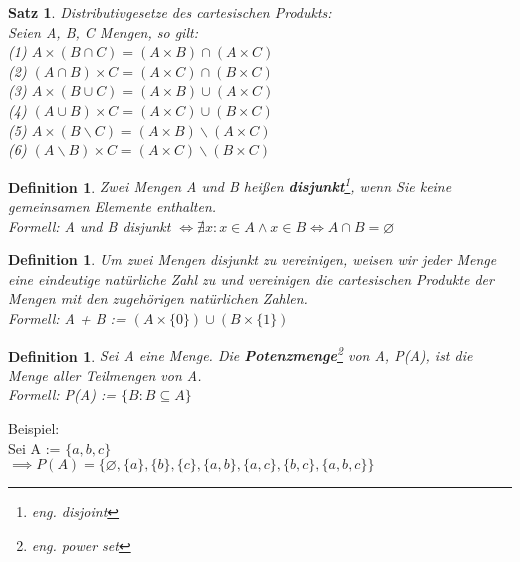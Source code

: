 \documentclass[12pt,german,a4]{article}
\begin{document}
\newtheorem{satz5}[satz]{Satz}
\begin{satz5}
Distributivgesetze des cartesischen Produkts:\\
Seien A, B, C Mengen, so gilt:\\
(1) $A \times (B \cap C) = (A \times B) \cap (A \times C)$\\
(2) $(A \cap B) \times C = (A \times C) \cap (B \times C)$\\
(3) $A \times (B \cup C) = (A \times B) \cup (A \times C)$\\
(4) $(A \cup B) \times C = (A \times C) \cup (B \times C)$\\
(5) $A \times (B \backslash C) = (A \times B) \backslash (A \times C)$\\
(6) $(A \backslash B) \times C = (A \times C) \backslash (B \times C)$
\end{satz5}

\newtheorem{defDisjoint}[defSet]{Definition}
\begin{defDisjoint}
Zwei Mengen A und B heißen {\bf disjunkt}\footnote{eng. disjoint}, wenn Sie keine gemeinsamen Elemente enthalten.\\
Formell: A und B disjunkt $\Leftrightarrow \nexists x: x \in A \wedge x \in B \Leftrightarrow A \cap B = \varnothing$
\end{defDisjoint}

\pagebreak

\newtheorem{defDisjointUnion}[defSet]{Definition}
\begin{defDisjointUnion}
Um zwei Mengen disjunkt zu vereinigen, weisen wir jeder Menge eine eindeutige natürliche Zahl zu und vereinigen die cartesischen Produkte der Mengen mit den zugehörigen natürlichen Zahlen.\\
Formell: A + B := $(A \times \{0\}) \cup (B \times \{1\})$\\
\end{defDisjointUnion}

\newtheorem{defPowerSet}[defSet]{Definition}
\begin{defPowerSet}
Sei A eine Menge. Die {\bf Potenzmenge}\footnote{eng. power set} von A, P(A), ist die Menge aller Teilmengen von A.\\
Formell: P(A) := $\{B: B \subseteq A\}$
\end{defPowerSet}

Beispiel:\\
Sei A := $\{a, b, c\}$\\
$\implies P(A) = \{\varnothing, \{a\}, \{b\}, \{c\}, \{a, b\}, \{a, c\}, \{b, c\}, \{a, b, c\}\}$
\end{document}
